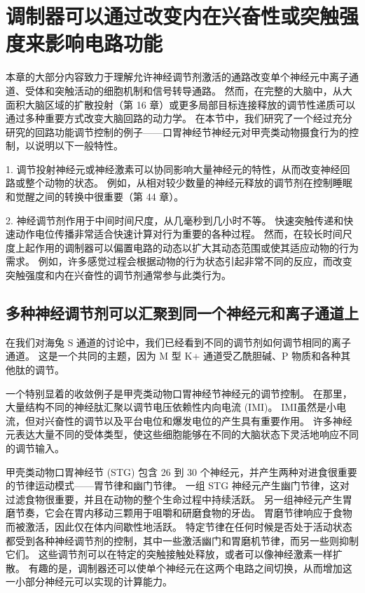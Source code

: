 \section{调制器可以通过改变内在兴奋性或突触强度来影响电路功能}

本章的大部分内容致力于理解允许神经调节剂激活的通路改变单个神经元中离子通道、受体和突触活动的细胞机制和信号转导通路。 然而，在完整的大脑中，从大面积大脑区域的扩散投射（第 16 章）或更多局部目标连接释放的调节性递质可以通过多种重要方式改变大脑回路的动力学。 在本节中，我们研究了一个经过充分研究的回路功能调节控制的例子——口胃神经节神经元对甲壳类动物摄食行为的控制，以说明以下一般特性。

1. 调节投射神经元或神经激素可以协同影响大量神经元的特性，从而改变神经回路或整个动物的状态。 例如，从相对较少数量的神经元释放的调节剂在控制睡眠和觉醒之间的转换中很重要（第 44 章）。 

2. 神经调节剂作用于中间时间尺度，从几毫秒到几小时不等。 快速突触传递和快速动作电位传播非常适合快速计算对行为重要的各种过程。 然而，在较长时间尺度上起作用的调制器可以偏置电路的动态以扩大其动态范围或使其适应动物的行为需求。 例如，许多感觉过程会根据动物的行为状态引起非常不同的反应，而改变突触强度和内在兴奋性的调节剂通常参与此类行为。

\subsection{多种神经调节剂可以汇聚到同一个神经元和离子通道上}
在我们对海兔 S 通道的讨论中，我们已经看到不同的调节剂如何调节相同的离子通道。 这是一个共同的主题，因为 M 型 K+ 通道受乙酰胆碱、P 物质和各种其他肽的调节。

一个特别显着的收敛例子是甲壳类动物口胃神经节神经元的调节控制。 在那里，大量结构不同的神经肽汇聚以调节电压依赖性内向电流 (IMI)。 IMI虽然是小电流，但对兴奋性的调节以及平台电位和爆发电位的产生具有重要作用。 许多神经元表达大量不同的受体类型，使这些细胞能够在不同的大脑状态下灵活地响应不同的调节输入。

甲壳类动物口胃神经节 (STG) 包含 26 到 30 个神经元，并产生两种对进食很重要的节律运动模式——胃节律和幽门节律。 一组 STG 神经元产生幽门节律，这对过滤食物很重要，并且在动物的整个生命过程中持续活跃。 另一组神经元产生胃磨节奏，它会在胃内移动三颗用于咀嚼和研磨食物的牙齿。 胃磨节律响应于食物而被激活，因此仅在体内间歇性地活跃。 特定节律在任何时候是否处于活动状态都受到各种神经调节剂的控制，其中一些激活幽门和胃磨机节律，而另一些则抑制它们。 这些调节剂可以在特定的突触接触处释放，或者可以像神经激素一样扩散。 有趣的是，调制器还可以使单个神经元在这两个电路之间切换，从而增加这一小部分神经元可以实现的计算能力。

